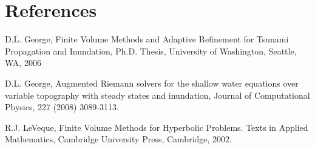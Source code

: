 \documentclass{beamer}
\begin{document}
\section{References}
\frame
{
\begin{thebibliography}{1}

 D.L. George, Finite Volume Methods and Adaptive Refinement for Tsunami Propagation and Inundation, Ph.D. Thesis, University of Washington, Seattle, WA, 2006

 D.L. George, Augmented Riemann solvers for the shallow water equations over variable topography with steady states and inundation, Journal of Computational Physics, 227 (2008)  3089-3113.

 R.J. LeVeque, Finite Volume Methods for Hyperbolic Problems.  Texts in Applied Mathematics, Cambridge University Press, Cambridge, 2002.

\end{thebibliography}
}
\end{document}
